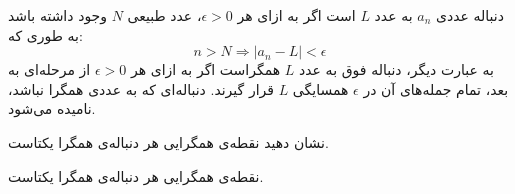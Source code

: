 


\begin{DEFINITION}
	\p
دنباله عددی
$a_n$
 به عدد 
$L$
است اگر به ازای هر
$\epsilon > 0$،
عدد طبیعی
$N$
وجود داشته باشد به طوری که:
$$n > N \Rightarrow |a_n - L| < \epsilon$$
به عبارت دیگر، دنباله فوق به عدد
$L$
همگراست اگر به ازای هر
$\epsilon > 0$
از مرحله‌ای به بعد، تمام جمله‌های آن در
$\epsilon$
 همسایگی
$L$
 قرار گیرند. دنباله‌ای که به عددی همگرا نباشد، 
  نامیده می‌شود.
\end{DEFINITION}

\begin{PROBLEM}
  \p
  نشان دهید نقطه‌ی همگرایی هر دنباله‌ی همگرا یکتاست.

\end{PROBLEM}
    \begin{THEOREM}
      نقطه‌ی همگرایی هر دنباله‌ی همگرا یکتاست.
    \end{THEOREM}

